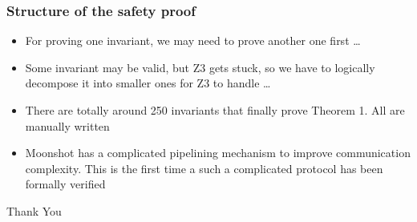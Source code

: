 \documentclass{beamer}
\begin{document}
\begin{frame}
    \frametitle{Structure of the safety proof}
    \begin{itemize}
        \item For proving one invariant, we may need to prove another
            one first \dots
            \pause
            \vfill
        \item Some invariant may be valid, but Z3 gets stuck, so we
            have to logically decompose it into smaller ones for Z3 to
            handle \dots
            \pause
            \vfill
        \item There are totally around 250 invariants that finally
            prove Theorem 1. All are manually written
            \pause
            \vfill
        \item Moonshot has a complicated pipelining mechanism to
            improve communication complexity. This is the first time a
            such a complicated protocol has been formally verified
    \end{itemize}
    \pause
    \vfill
    \begin{center}
        \Large{Thank You}
    \end{center}
\end{frame}
\end{document}
